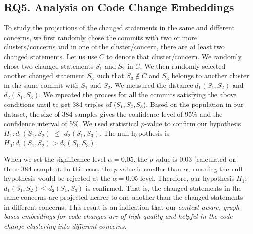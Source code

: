 \subsection{RQ5. Analysis on Code Change Embeddings}

To study the projections of the changed statements in the same and
different concerns, we first randomly chose the commits with two or
more clusters/concerns and in one of the cluster/concern, there are at
least two changed statements. Let us use $C$ to denote that
cluster/concern. We randomly chose two changed statements $S_1$ and
$S_2$ in $C$. We then randomly selected another changed statement
$S_3$ such that $S_3 \notin C$ and $S_3$ belongs to another cluster in
the same commit with $S_1$ and $S_2$. We measured the distance
$d_1(S_1,S_2)$ and $d_2(S_1,S_3)$. We repeated the process for all the
commits satisfying the above conditions until to get 384 triples of
($S_1, S_2, S_3$). Based on the population in our dataset, the size of
384 samples gives the confidence level of 95\% and the confidence
interval of 5\%.
%
We used statistical $p$-value to confirm our hypothesis
$H_1: d_1(S_1,S_2)$ $\leq$ $d_2(S_1,S_3)$. The null-hypothesis is
\textit{\textbf{$H_0: d_1(S_1,S_2) > d_2(S_1,S_3)$}}.

When we set the significance level $\alpha = 0.05$, the $p$-value is
$0.03$ (calculated on these 384 samples). In this case, the $p$-value
is smaller than $\alpha$, meaning the null hypothesis would be
rejected at the $\alpha = 0.05$ level. Therefore, our hypothesis
$H_1$: $d_1(S_1,S_2)$$ \leq$$ d_2(S_1,S_3)$ is confirmed.  That is,
the changed statements in the same concerns are projected nearer to
one another than the changed statements in different concerns. This
result is an indication that our {\em context-aware, graph-based embeddings
for code changes are of high quality and helpful in the code change
clustering into different concerns}.





